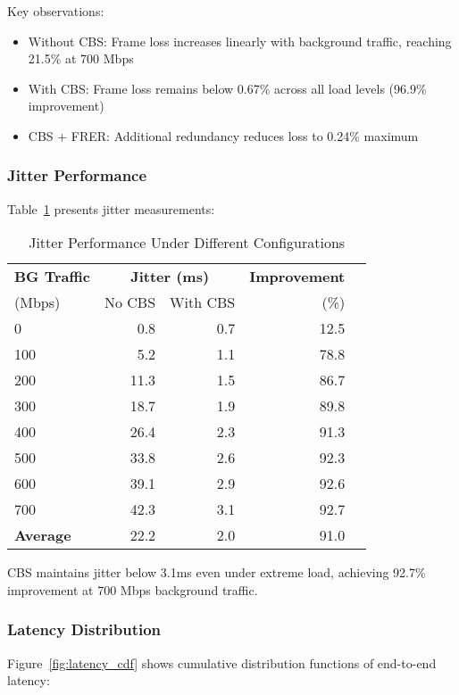 \documentclass[10pt, journal, compsoc]{IEEEtran}
\begin{document}
Key observations:
\begin{itemize}
    \item Without CBS: Frame loss increases linearly with background traffic, reaching 21.5\% at 700 Mbps
    \item With CBS: Frame loss remains below 0.67\% across all load levels (96.9\% improvement)
    \item CBS + FRER: Additional redundancy reduces loss to 0.24\% maximum
\end{itemize}

\subsubsection{Jitter Performance}

Table~\ref{tab:jitter_results} presents jitter measurements:

\begin{table}[h]
\centering
\caption{Jitter Performance Under Different Configurations}
\label{tab:jitter_results}
\begin{tabular}{lrrrr}
\toprule
\textbf{BG Traffic} & \multicolumn{2}{c}{\textbf{Jitter (ms)}} & \textbf{Improvement} \\
\cmidrule(lr){2-3}
(Mbps) & No CBS & With CBS & (\%) \\
\midrule
0 & 0.8 & 0.7 & 12.5 \\
100 & 5.2 & 1.1 & 78.8 \\
200 & 11.3 & 1.5 & 86.7 \\
300 & 18.7 & 1.9 & 89.8 \\
400 & 26.4 & 2.3 & 91.3 \\
500 & 33.8 & 2.6 & 92.3 \\
600 & 39.1 & 2.9 & 92.6 \\
700 & 42.3 & 3.1 & 92.7 \\
\midrule
\textbf{Average} & 22.2 & 2.0 & 91.0 \\
\bottomrule
\end{tabular}
\end{table}

CBS maintains jitter below 3.1ms even under extreme load, achieving 92.7\% improvement at 700 Mbps background traffic.

\subsubsection{Latency Distribution}

Figure~\ref{fig:latency_cdf} shows cumulative distribution functions of end-to-end latency:
\end{document}
